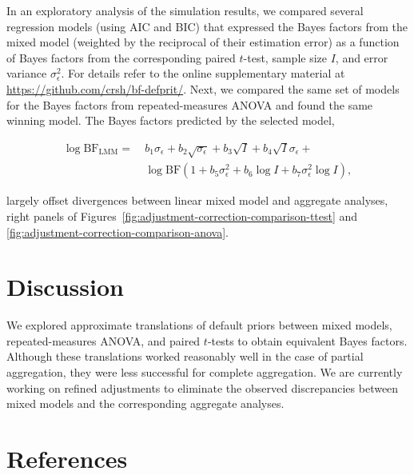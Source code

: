 \documentclass[
  man,floatsintext,draftall]{apa6}
\begin{document}
In an exploratory analysis of the simulation results, we compared several regression models (using AIC and BIC) that expressed the Bayes factors from the mixed model (weighted by the reciprocal of their estimation error) as a function of Bayes factors from the corresponding paired \(t\)-test, sample size \(I\), and error variance \(\sigma_\epsilon^2\).
For details refer to the online supplementary material at \url{https://github.com/crsh/bf-defprit/}.
Next, we compared the same set of models for the Bayes factors from repeated-measures ANOVA and found the same winning model.
The Bayes factors predicted by the selected model,

\[
\begin{aligned}
\log\mathrm{BF_{LMM}} = & ~ b_1 \sigma_\epsilon + b_2 \sqrt{\sigma_\epsilon} + b_3 \sqrt{I} + b_4 \sqrt{I} \sigma_\epsilon +\\
    & ~\log \mathrm{BF} (1 + b_5 \sigma_\epsilon^2 + b_6 \log I + b_7 \sigma_\epsilon^2 \log I),
\end{aligned}
\]

largely offset divergences between linear mixed model and aggregate analyses, right panels of Figures~\ref{fig:adjustment-correction-comparison-ttest} and \ref{fig:adjustment-correction-comparison-anova}.

\hypertarget{discussion}{%
\section{Discussion}\label{discussion}}

We explored approximate translations of default priors between mixed models, repeated-measures ANOVA, and paired \(t\)-tests to obtain equivalent Bayes factors.
Although these translations worked reasonably well in the case of partial aggregation, they were less successful for complete aggregation.
We are currently working on refined adjustments to eliminate the observed discrepancies between mixed models and the corresponding aggregate analyses.

\newpage

\hypertarget{references}{%
\section{References}\label{references}}
\end{document}
